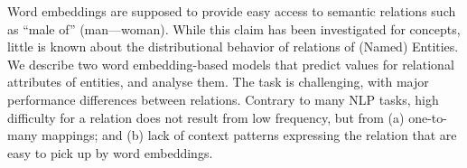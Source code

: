 Word embeddings are supposed to provide easy access to semantic relations such as ``male of'' (man---woman). While this claim has been investigated for concepts, little is known about the distributional behavior of relations of (Named) Entities. We describe two word embedding-based models that predict values for relational attributes of entities, and analyse them. The task is challenging, with major performance differences between relations. Contrary to many NLP tasks, high difficulty for a relation does not result from low frequency, but from (a) one-to-many mappings; and (b) lack of context patterns expressing the relation that are easy to pick up by word embeddings.
